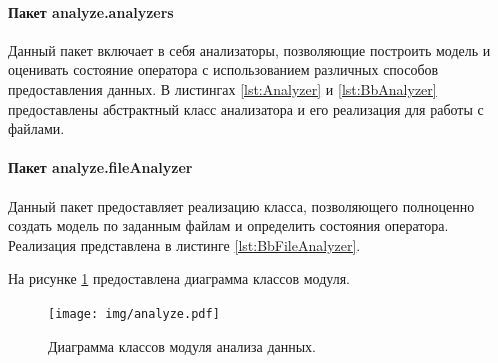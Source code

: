 





\paragraph{Пакет analyze.analyzers}

Данный пакет включает в себя анализаторы, позволяющие построить модель и оценивать состояние оператора с использованием различных способов предоставления данных. В листингах \ref{lst:Analyzer} и \ref{lst:BbAnalyzer} предоставлены абстрактный класс анализатора и его реализация для работы с файлами.





\paragraph{Пакет analyze.fileAnalyzer}
Данный пакет предоставляет реализацию класса, позволяющего полноценно создать модель по заданным файлам и определить состояния оператора. Реализация представлена в листинге \ref{lst:BbFileAnalyzer}.



На рисунке \ref{fig:analyzerUml} предоставлена диаграмма классов модуля.

\begin{figure}[H]
	\centering
	\texttt{[image: img/analyze.pdf]}
	\caption{Диаграмма классов модуля анализа данных.}
	\label{fig:analyzerUml}
\end{figure}

